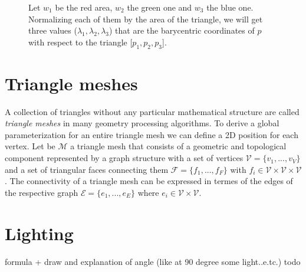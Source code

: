 \begin{figure}
  \centering
    \caption{Let $w_1$ be the red area, $w_2$ the green one and $w_3$ the blue one. Normalizing each of them by the area of the triangle, we will get three values ($\lambda_1, \lambda_2, \lambda_3$) that are the barycentric coordinates of $p$ with respect to the triangle [$p_1, p_2, p_3$].}
    \label{fig:barycentric-coord}
  \end{figure}


\section{Triangle meshes}
A collection of triangles without any particular mathematical structure are called \textit{triangle meshes} in many geometry processing algorithms. To derive a global parameterization for an entire triangle mesh we can define a 2D position for each vertex. Let be $\mathcal{M}$ a triangle mesh that consists of a geometric and topological component represented by a graph structure with a set of vertices $\mathcal{V} = \{ v_1, ..., v_V \}$ and a set of triangular faces connecting them $\mathcal{F} = \{ f_1, ... , f_F \}$ with $f_i \in \mathcal{V} \times \mathcal{V} \times \mathcal{V}$. The connectivity of a triangle mesh can be expressed in termes of the edges of the respective graph $\mathcal{E} = \{ e_1, ..., e_E \}$ where $e_i \in \mathcal{V} \times \mathcal{V}$.


\section{Lighting}
formula + draw and explanation of angle (like at 90 degree some light..e.tc.)
todo

